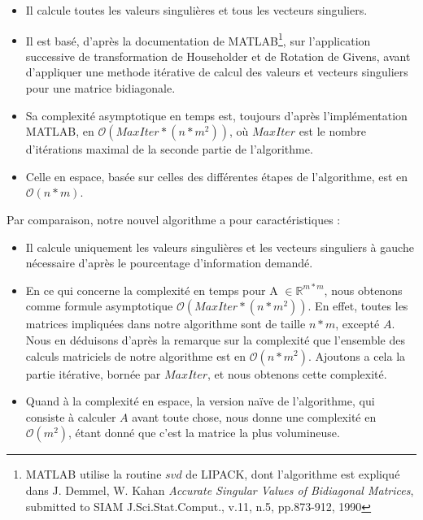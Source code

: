 \documentclass[a4paper,12pt]{article}
\begin{document}
        \begin{itemize}
        \item Il calcule toutes les valeurs singulières et tous les vecteurs
            singuliers.

        \item Il est basé, d'après la documentation de
            MATLAB\footnote{MATLAB utilise la routine $svd$ de LIPACK, dont
            l'algorithme est expliqué dans J. Demmel, W. Kahan
            \emph{Accurate Singular Values of Bidiagonal Matrices},
            submitted to SIAM J.Sci.Stat.Comput., v.11, n.5, pp.873-912,
            1990}, sur l'application successive de transformation de Householder
            et de Rotation de Givens, avant d'appliquer une methode itérative de
            calcul des valeurs et vecteurs singuliers pour une matrice
            bidiagonale.

        \item Sa complexité asymptotique en temps est, toujours d'après
            l'implémentation MATLAB, en $\mathcal{O}(MaxIter*(n*m^2))$, où
            $MaxIter$ est le nombre d'itérations maximal de la seconde
            partie de l'algorithme.

        \item Celle en espace, basée sur celles des différentes étapes de
            l'algorithme, est en $\mathcal{O}(n*m)$.
        \end{itemize}

    \bigskip

        Par comparaison, notre nouvel algorithme a pour caractéristiques :

        \begin{itemize}
        \item Il calcule uniquement les valeurs singulières et les vecteurs
            singuliers à gauche nécessaire d'après le pourcentage d'information
            demandé.

        \item En ce qui concerne la complexité en temps pour A $\in
            \mathbb{R}^{m*m}$, nous obtenons comme formule asymptotique
            $\mathcal{O}(MaxIter*(n*m^2))$. En effet, toutes les matrices
            impliquées dans notre algorithme sont de taille $n*m$, excepté $A$.
            Nous en déduisons d'après la remarque sur la complexité que
            l'ensemble des calculs matriciels de notre algorithme est en
            $\mathcal{O}(n*m^2)$.  Ajoutons a cela la partie itérative, bornée
            par $MaxIter$, et nous obtenons cette complexité.

        \item Quand à la complexité en espace, la version naïve de l'algorithme,
            qui consiste à calculer $A$ avant toute chose, nous donne une
            complexité en $\mathcal{O}(m^2)$, étant donné que c'est la matrice
            la plus volumineuse.
        \end{itemize}
\end{document}
